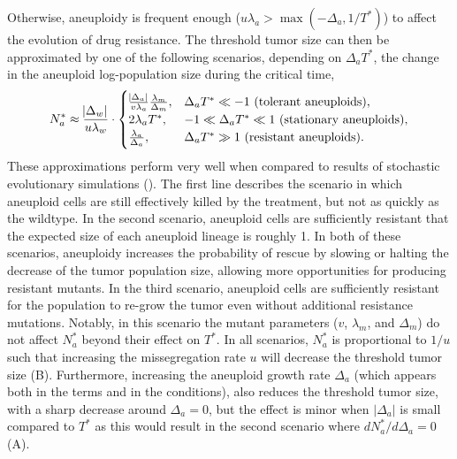 \documentclass[12pt]{extarticle}
\begin{document}
Otherwise, aneuploidy is frequent enough ($u\lambda_a > \max{\left(-\Delta_a, 1/T^*\right)}$) to affect the evolution of drug resistance. 
The threshold tumor size can then be approximated by one of the following scenarios, depending on $\Delta_a T^*$, the change in the aneuploid log-population size during the critical time,
\begin{equation}  \label{eq:N_a}
\begin{aligned}
N_a^* \approx 
  \frac{\abs{\Delta_w}}{u\lambda_w} \cdot \begin{cases}
    \frac{\abs{\Delta_a}}{v\lambda_a}  \frac{\lambda_m}{\Delta_m} ,&
  \Delta_a T^* \ll -1 \text{ (tolerant aneuploids)},\\ 
  2\lambda_a T^* ,&
  -1 \ll \Delta_a T^* \ll 1  \text{ (stationary aneuploids)},\\ 
  \frac{\lambda_a}{\Delta_a} ,&
   \Delta_a T^* \gg 1 \text{ (resistant aneuploids)}.
  \end{cases}
\end{aligned}
\end{equation}
These approximations perform very well when compared to results of stochastic evolutionary simulations ().
The first line describes the scenario in which aneuploid cells are still effectively killed by the treatment, but not as quickly as the wildtype. 
In the second scenario, aneuploid cells are sufficiently resistant that the expected size of each aneuploid lineage is roughly 1.
In both of these scenarios, aneuploidy increases the probability of rescue by slowing or halting the decrease of the tumor population size, allowing more opportunities for producing resistant mutants. 
In the third scenario, aneuploid cells are sufficiently resistant for the population to re-grow the tumor even without additional resistance mutations.
Notably, in this scenario the mutant parameters ($v$, $\lambda_m$, and $\Delta_m$) do not affect $N_a^*$ beyond their effect on $T^*$.
In all scenarios, $N_a^*$ is proportional to $1/u$ such that increasing the missegregation rate $u$ will decrease the threshold tumor size (B).
Furthermore, increasing the aneuploid growth rate $\Delta_a$ (which appears both in the terms and in the conditions), also reduces the threshold tumor size, with a sharp decrease around $\Delta_a=0$, but the effect is minor when $|\Delta_a|$ is small compared to $T^*$ as this would result in the second scenario where  $dN_a^*/d\Delta_a=0$ (A). %
\end{document}
